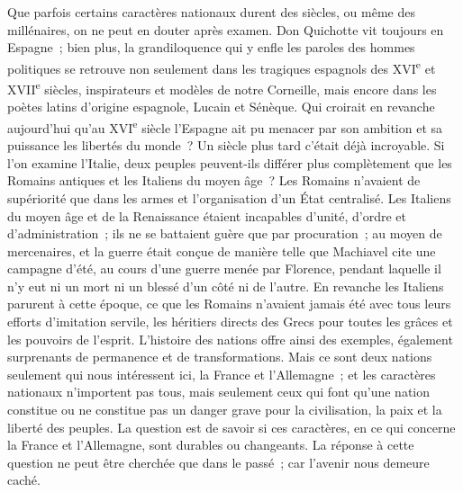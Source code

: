 \documentclass[french,twoside]{book} %
\begin{document}
Que parfois certains caractères nationaux durent des siècles, ou même des millénaires, on ne peut en douter après examen. Don Quichotte vit toujours en Espagne ; bien plus, la grandiloquence qui y enfle les paroles des hommes politiques se retrouve non seulement dans les tragiques espagnols des XVI\textsuperscript{e} et XVII\textsuperscript{e} siècles, inspirateurs et modèles de notre Corneille, mais encore dans les poètes latins d'origine espagnole, Lucain et Sénèque. Qui croirait en revanche aujourd'hui qu'au XVI\textsuperscript{e} siècle l'Espagne ait pu menacer par son ambition et sa puissance les libertés du monde ? Un siècle plus tard c'était déjà incroyable. Si l'on examine l'Italie, deux peuples peuvent-ils différer plus complètement que les Romains antiques et les Italiens du moyen âge ? Les Romains n'avaient de supériorité que dans les armes et l'organisation d'un État centralisé. Les Italiens du moyen âge et de la Renaissance étaient incapables d'unité, d'ordre et d'administration ; ils ne se battaient guère que par procuration ; au moyen de mercenaires, et la guerre était conçue de manière telle que Machiavel cite une campagne d'été, au cours d'une guerre menée par Florence, pendant laquelle il n'y eut ni un mort ni un blessé d'un côté ni de l'autre. En revanche les Italiens parurent à cette époque, ce que les Romains n'avaient jamais été avec tous leurs efforts d'imitation servile, les héritiers directs des Grecs pour toutes les grâces et les pouvoirs de l'esprit. L'histoire des nations offre ainsi des exemples, également surprenants de permanence et de transformations. Mais ce sont deux nations seulement qui nous intéressent ici, la France et l'Allemagne ; et les caractères nationaux n'importent pas tous, mais seulement ceux qui font qu'une nation constitue ou ne constitue pas un danger grave pour la civilisation, la paix et la liberté des peuples. La question est de savoir si ces caractères, en ce qui concerne la France et l'Allemagne, sont durables ou chan­geants. La réponse à cette question ne peut être cherchée que dans le passé ; car l'avenir nous demeure caché.\par
\end{document}
